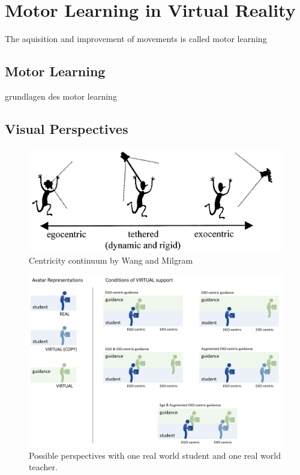 \chapter{Motor Learning in Virtual Reality}
\label{chapter:theoretical_background}
The aquisition and improvement of movements is called motor learning~\cite{mlbook}

\section{Motor Learning}
\label{section:motor_learning}
grundlagen des motor learning
\section{Visual Perspectives}
\label{section:visual_perspectives}
\begin{figure}[htb]
	\centering
	\includegraphics[width=\textwidth]{figures/ego_exo_continuum.PNG}
	\caption[Centricity continuum]{Centricity continuum by Wang and Milgram~\cite{centricitycontinuum}}
	\label{fig:ego-exo-continuum}
\end{figure}

\begin{figure}[htb]
	\centering
	\includegraphics[width=\textwidth]{figures/perspectives.png}
	\caption[Possible perspectives]{Possible perspectives with one real world student and one real world teacher.}
	\label{fig:perspectives}
\end{figure}

